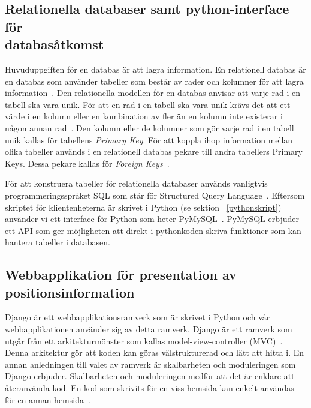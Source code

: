 \documentclass[a4paper,12pt]{article}
\begin{document}
\subsection{Relationella databaser samt python-interface för \\databasåtkomst} \label{relationella_databaser}
Huvuduppgiften för en databas är att lagra information. En relationell databas är en databas som använder tabeller som består av rader och kolumner för att lagra information~\cite{database_fundamentals}. Den relationella modellen för en databas anvisar att varje rad i en tabell ska vara unik. För att en rad i en tabell ska vara unik krävs det att ett värde i en kolumn eller en kombination av fler än en kolumn inte existerar i någon annan rad~\cite{database_fundamentals}. Den kolumn eller de kolumner som gör varje rad i en tabell unik kallas för tabellens \textit{Primary Key}.
För att koppla ihop information mellan olika tabeller används i en relationell databas pekare till andra tabellers Primary Keys. Dessa pekare kallas för \textit{Foreign Keys}~\cite{database_fundamentals}.

För att konstruera tabeller för relationella databaser används vanligtvis programmeringsspråket SQL som står för Structured Query Language~\cite{sql}.
Eftersom skriptet för klientenheterna är skrivet i Python (se sektion ~\ref{pythonskript}) använder vi ett interface för Python som heter PyMySQL~\cite{pymysql}. PyMySQL erbjuder ett API som ger möjligheten att direkt i pythonkoden skriva funktioner som kan hantera tabeller i databasen.


 \subsection{Webbapplikation för presentation av positionsinformation}\label{django}
 Django är ett webbapplikationsramverk som är skrivet i Python och vår webbapplikationen använder sig av detta ramverk. Django är ett ramverk som utgår från ett arkitekturmönster som kallas model-view-controller (MVC)~\cite{djangoMVC}. Denna arkitektur gör att koden kan göras välstrukturerad och lätt att hitta i. En annan anledningen till valet av ramverk är skalbarheten och moduleringen som Django erbjuder. Skalbarheten och moduleringen medför att det är enklare att återanvända kod. En kod som skrivits för en viss hemsida kan enkelt användas för en annan hemsida~\cite{djangoMVC}.
\end{document}
